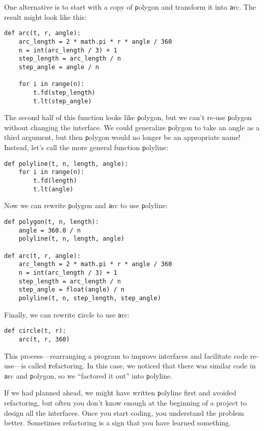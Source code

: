 \documentclass[
DIV=11,
fontsize=13,
twoside,
headinclude=false,
titlepage=firstiscover,
abstract=true,
headsepline=true,
footsepline=true,
chapterprefix=true, %
headings=big,
bibliography=totoc,%
captions=tableheading
]{scrbook}
\theoremstyle{definition}
\begin{document}
One alternative is to start with a copy
of {\texttt polygon} and transform it into {\texttt arc}.  The result
might look like this:

\begin{lstlisting}
def arc(t, r, angle):
    arc_length = 2 * math.pi * r * angle / 360
    n = int(arc_length / 3) + 1
    step_length = arc_length / n
    step_angle = angle / n
    
    for i in range(n):
        t.fd(step_length)
        t.lt(step_angle)
\end{lstlisting}
%
The second half of this function looks like {\texttt polygon}, but we
can't re-use {\texttt polygon} without changing the interface.  We could
generalize {\texttt polygon} to take an angle as a third argument,
but then {\texttt polygon} would no longer be an appropriate name!
Instead, let's call the more general function {\texttt polyline}:

\begin{lstlisting}
def polyline(t, n, length, angle):
    for i in range(n):
        t.fd(length)
        t.lt(angle)
\end{lstlisting}
%
Now we can rewrite {\texttt polygon} and {\texttt arc} to use {\texttt polyline}:

\begin{lstlisting}
def polygon(t, n, length):
    angle = 360.0 / n
    polyline(t, n, length, angle)

def arc(t, r, angle):
    arc_length = 2 * math.pi * r * angle / 360
    n = int(arc_length / 3) + 1
    step_length = arc_length / n
    step_angle = float(angle) / n
    polyline(t, n, step_length, step_angle)
\end{lstlisting}
%
Finally, we can rewrite {\texttt circle} to use {\texttt arc}:

\begin{lstlisting}
def circle(t, r):
    arc(t, r, 360)
\end{lstlisting}
%
This process---rearranging a program to improve
interfaces and facilitate code re-use---is called {\textbf refactoring}.
In this case, we noticed that there was similar code in {\texttt arc} and
{\texttt polygon}, so we ``factored it out'' into {\texttt polyline}.

If we had planned ahead, we might have written {\texttt polyline} first
and avoided refactoring, but often you don't know enough at the
beginning of a project to design all the interfaces.  Once you start
coding, you understand the problem better.  Sometimes refactoring is a
sign that you have learned something.
\end{document}
